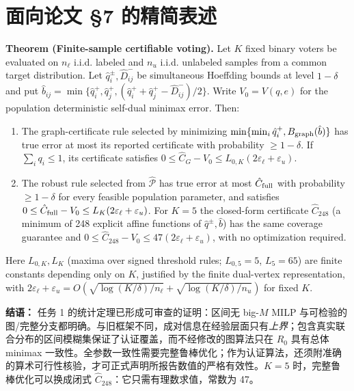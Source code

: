 \documentclass[11pt,a4paper]{ctexart}
\theoremstyle{definition}
\newcommand{\calP}{\mathcal P}
\newcommand{\epsl}{\varepsilon_{\ell}}
\newcommand{\epsu}{\varepsilon_u}
\newcommand{\hC}{\widehat C}
\begin{document}
\section{面向论文 \S7 的精简表述}
\begin{keybox}
\textbf{Theorem (Finite-sample certifiable voting).}
Let $K$ fixed binary voters be evaluated on $n_\ell$ i.i.d. labeled and $n_u$ i.i.d. unlabeled samples from a common target distribution. Let $\hat q_i^\pm,\hat D_{ij}^-$ be simultaneous Hoeffding bounds at level $1-\delta$ and put $\hat b_{ij}=\min\{\hat q_i^+,\hat q_j^+,(\hat q_i^++\hat q_j^+-\hat D_{ij}^-)/2\}$. Write $V_0=V(q,e)$ for the population deterministic self-dual minimax error. Then: 
\begin{enumerate}[leftmargin=1.5em]
\item The graph-certificate rule selected by minimizing $\min\{\min_i\hat q_i^+,B_{\rm graph}(\hat b)\}$ has true error at most its reported certificate with probability $\ge1-\delta$. If $\sum_iq_i\le1$, its certificate satisfies $0\le\hat C_G-V_0\le L_{0,K}(2\epsl+\epsu)$.
\item The robust rule selected from $\widehat{\calP}$ has true error at most $\hat C_{\rm full}$ with probability $\ge1-\delta$ for every feasible population parameter, and satisfies $0\le\hat C_{\rm full}-V_0\le L_K(2\epsl+\epsu)$. For $K=5$ the closed-form certificate $\hat C_{248}$ (a minimum of 248 explicit affine functions of $\hat q^\pm,\hat b$) has the same coverage guarantee and $0\le\hat C_{248}-V_0\le 47(2\epsl+\epsu)$, with no optimization required.
\end{enumerate}
Here $L_{0,K},L_K$ (maxima over signed threshold rules; $L_{0,5}=5$, $L_5=65$) are finite constants depending only on $K$, justified by the finite dual-vertex representation, with $2\epsl+\epsu=O(\sqrt{\log(K/\delta)/n_\ell}+\sqrt{\log(K/\delta)/n_u})$ for fixed $K$.
\end{keybox}
\vspace{.4em}
\noindent\textbf{结语：} 任务 1 的统计定理已形成可审查的证明：区间无 big-$M$ MILP 与可检验的图/完整分支都明确。与旧框架不同，成对信息在经验层面只有\emph{上界}；包含真实联合分布的区间模糊集保证了认证覆盖，而不经修改的图算法只在 $R_0$ 具有总体 minimax 一致性。全参数一致性需要完整鲁棒优化；作为认证算法，还须附准确的算术可行性核验，才可正式声明所报告数值的严格有效性。$K=5$ 时，完整鲁棒优化可以换成闭式 $\hC_{248}$：它只需有理数求值，常数为 47。
\end{document}
